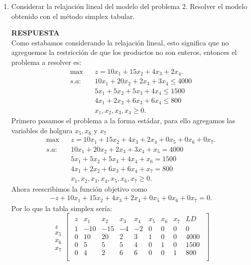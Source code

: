 \documentclass[11pt,letterpaper]{article}
\newcommand{\res}{\textbf{RESPUESTA}\\}
\begin{document}
\begin{enumerate}
\item Considerar la relajación lineal del modelo del problema 2. Resolver el modelo obtenido con el método simplex tabular.

\res Como estabamos considerando la relajación lineal, esto significa que no agreguemos la restricción de que los productos no son enteros, entonces el problema a resolver es:
\begin{align*}
\max\ \ \ \ & z=10x_1+15x_2+4x_3+2x_4.\\
s.a:\ \ \ \ & 10x_1+20x_2 +2x_3+3x_4\leq 4000\\
	 & 5x_1+5x_2+5x_3+4x_4\leq 1500\\
	 &  4x_1+2x_2+6x_3+6x_4 \leq 800\\
	 & x_1,x_2,x_3,x_4 \geq 0. 
\end{align*}
Primero pasamos el problema a la forma estádar, para ello agregamos las variables de holgura $x_5, x_6$ y $x_7$
\begin{align*}
\max\ \ \ \ & z=10x_1+15x_2+4x_3+2x_4+0x_5+0x_6+0x_7.\\
s.a:\ \ \ \ & 10x_1+20x_2 +2x_3+3x_4+x_5 = 4000\\
	 & 5x_1+5x_2+5x_3+4x_4+x_6= 1500\\
	 &  4x_1+2x_2+6x_3+6x_4  +x_7= 800\\
	 & x_1,x_2, x_3, x_4, x_5,x_6,x_7 \geq 0. 
\end{align*}
Ahora reescribimos la función objetivo como 
\begin{align*}
-z+10x_1+15x_2+4x_3+2x_4+0x_5+0x_6+0x_7=0.
\end{align*}
Por lo que la tabla simplex sería:
\begin{equation}
\begin{array}{c}
\\
z \\ 
x_5 \\
x_6 \\
x_7 
\end{array}
\begin{bmatrix}
\begin{array}{c||cccccccc}
  z & x_1 & x_2 & x_3 & x_4 & x_5 & x_6 & x_7 & LD \\ \hline \hline
  1 &-10 &-15 &-4 &-2 & 0 & 0 & 0 & 0\\ 
  0 & 10 & 20 & 2 & 3 & 1 & 0 & 0 & 4000  \\
  0 &  5 &  5 & 5 & 4 & 0 & 1 & 0 & 1500 \\
  0 &  4 &  2 & 6 & 6 & 0 & 0 & 1 & 800 \\
\end{array}

\end{bmatrix}
\end{equation}
\end{enumerate}
\end{document}
